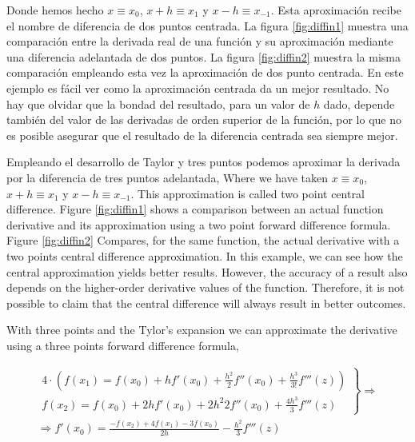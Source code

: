 \begin{paracol}{2}
Donde hemos hecho $x\equiv x_0$, $x+h\equiv x_1$ y $x-h\equiv x_{-1}$. Esta aproximación recibe el nombre de diferencia de dos puntos centrada. La figura \ref{fig:diffin1} muestra una comparación entre la derivada real de una función y su aproximación mediante una diferencia adelantada de dos puntos. La figura \ref{fig:diffin2} muestra la misma comparación empleando esta vez la aproximación de dos punto centrada. En este ejemplo es fácil ver como la aproximación centrada da un mejor resultado. No hay que olvidar que  la bondad del resultado, para un valor de $h$ dado, depende también del valor de las derivadas de orden superior de la función, por lo que no es posible asegurar que el resultado de la diferencia centrada sea siempre mejor.

Empleando el desarrollo de Taylor y tres puntos podemos aproximar la derivada por la diferencia de tres puntos adelantada,
\switchcolumn
Where we have taken $x\equiv x_0$, $x+h\equiv x_1$ y $x-h\equiv x_{-1}$. This approximation is called two point central difference. Figure \ref{fig:diffin1} shows a comparison between an actual function derivative and its approximation using a two point forward difference formula. Figure \ref{fig:diffin2} Compares, for the same function, the actual derivative with a two points central difference approximation. In this example, we can see how the central approximation yields better results. However, the accuracy of a result also depends on the higher-order derivative values of the function.  Therefore, it is not possible to claim that the central difference will always result in better outcomes.

 With three points and the Tylor's expansion we can approximate the derivative using a three points forward difference formula,   
\end{paracol}
\begin{align*}
\left. \begin{aligned}
4\cdot\left(f(x_1)=f(x_0)+hf'(x_0)+\frac{h^2}{2}f''(x_0)+\frac{h^3}{3!}f'''(z)\right)\\
f(x_2)=f(x_0)+2hf'(x_0)+2{h^2}{2}f''(x_0)+\frac{4h^3}{3}f'''(z)
\end{aligned} \right\rbrace \Rightarrow \\
\Rightarrow f'(x_0)=\frac{-f(x_2)+4f(x_1)-3f(x_0)}{2h}-\frac{h^2}{3}f'''(z) 
\end{align*} 

